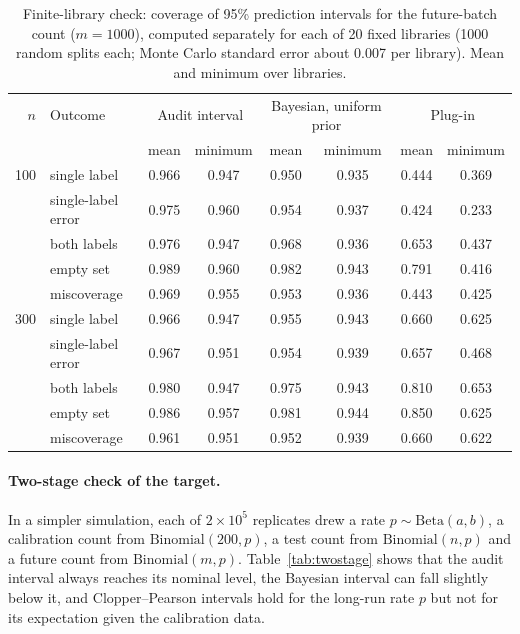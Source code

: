 \documentclass[10pt]{article}
\begin{document}
\begin{table}[ht]
\centering
\caption{Finite-library check: coverage of 95\% prediction intervals for the future-batch count ($m=1000$), computed separately for each of 20 fixed libraries (1000 random splits each; Monte Carlo standard error about 0.007 per library). Mean and minimum over libraries.}
\label{tab:library}
\small
\begin{tabular}{rlcccccc}
\toprule
$n$ & Outcome & \multicolumn{2}{c}{Audit interval} & \multicolumn{2}{c}{Bayesian, uniform prior} & \multicolumn{2}{c}{Plug-in} \\
 & & mean & minimum & mean & minimum & mean & minimum \\
\midrule
100 & single label       & 0.966 & 0.947 & 0.950 & 0.935 & 0.444 & 0.369 \\
    & single-label error & 0.975 & 0.960 & 0.954 & 0.937 & 0.424 & 0.233 \\
    & both labels        & 0.976 & 0.947 & 0.968 & 0.936 & 0.653 & 0.437 \\
    & empty set          & 0.989 & 0.960 & 0.982 & 0.943 & 0.791 & 0.416 \\
    & miscoverage        & 0.969 & 0.955 & 0.953 & 0.936 & 0.443 & 0.425 \\
300 & single label       & 0.966 & 0.947 & 0.955 & 0.943 & 0.660 & 0.625 \\
    & single-label error & 0.967 & 0.951 & 0.954 & 0.939 & 0.657 & 0.468 \\
    & both labels        & 0.980 & 0.947 & 0.975 & 0.943 & 0.810 & 0.653 \\
    & empty set          & 0.986 & 0.957 & 0.981 & 0.944 & 0.850 & 0.625 \\
    & miscoverage        & 0.961 & 0.951 & 0.952 & 0.939 & 0.660 & 0.622 \\
\bottomrule
\end{tabular}
\end{table}



\paragraph{Two-stage check of the target.} In a simpler simulation, each of $2\times10^5$ replicates drew a rate $p\sim\mathrm{Beta}(a,b)$, a calibration count from $\mathrm{Binomial}(200,p)$, a test count from $\mathrm{Binomial}(n,p)$ and a future count from $\mathrm{Binomial}(m,p)$. Table~\ref{tab:twostage} shows that the audit interval always reaches its nominal level, the Bayesian interval can fall slightly below it, and Clopper--Pearson intervals hold for the long-run rate $p$ but not for its expectation given the calibration data.
\end{document}
